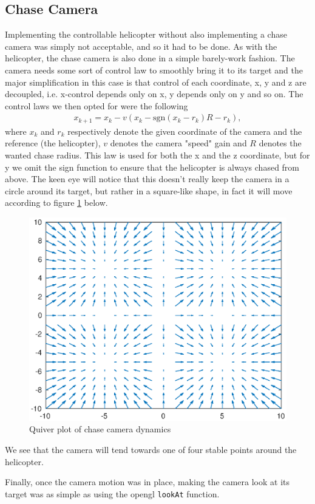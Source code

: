 \documentclass[]{article}
\begin{document}
\begin{multicols}{2}
\subsection{Chase Camera}
Implementing the controllable helicopter without also implementing a chase camera was simply not acceptable, and so it had to be done. As with the helicopter, the chase camera is also done in a simple barely-work fashion. The camera needs some sort of control law to smoothly bring it to its target and the major simplification in this case is that control of each coordinate, x, y and z are decoupled, i.e. x-control depends only on x, y depends only on y and so on. The control laws we then opted for were the following
\begin{align*}
x_{k+1} = x_k - v(x_k - \text{sgn}(x_k - r_k)R - r_k),
\end{align*}
where $x_k$ and $r_k$ respectively denote the given coordinate of the camera and the reference (the helicopter), $v$ denotes the camera "speed" gain and $R$ denotes the wanted chase radius. This law is used for both the x and the z coordinate, but for y we omit the sign function to ensure that the helicopter is always chased from above. The keen eye will notice that this doesn't really keep the camera in a circle around its target, but rather in a square-like shape, in fact it will move according to figure \ref{fig:quiver} below.
\begin{figure}[H]
\centering
\includegraphics[width=0.69\columnwidth]{quiver.eps}
\caption{Quiver plot of chase camera dynamics}
\label{fig:quiver}
\end{figure}
We see that the camera will tend towards one of four stable points around the helicopter.

Finally, once the camera motion was in place, making the camera look at its target was as simple as using the opengl \texttt{lookAt} function.


\end{multicols}
\end{document}
